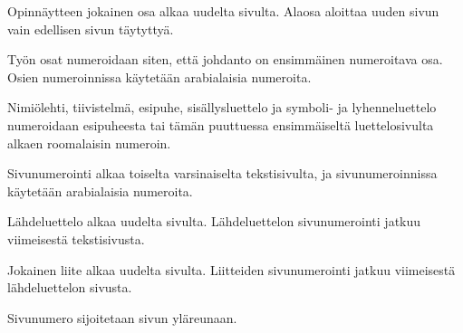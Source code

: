 \documentclass[english,12pt,a4paper,pdftex,elec,utf8]{aaltothesis}
\begin{document}
Opinn\"aytteen jokainen osa alkaa uudelta sivulta. Alaosa aloittaa uuden
sivun vain edellisen sivun t\"aytytty\"a.

Ty\"on osat numeroidaan siten, ett\"a johdanto on ensimm\"ainen numeroitava
osa. Osien numeroinnissa k\"aytet\"a\"an arabialaisia numeroita.

Nimi\"olehti, tiivistelm\"a, esipuhe, sis\"allysluettelo ja symboli- ja
lyhenneluettelo numeroidaan esipuheesta tai t\"am\"an puuttuessa
ensimm\"aiselt\"a luettelosivulta alkaen roomalaisin numeroin.

Sivunumerointi alkaa toiselta varsinaiselta tekstisivulta, ja
sivunumeroinnissa k\"aytet\"a\"an arabialaisia numeroita.

L\"ahdeluettelo alkaa uudelta sivulta. L\"ahdeluettelon sivunumerointi
jatkuu viimeisest\"a tekstisivusta.

Jokainen liite alkaa uudelta sivulta. Liitteiden sivunumerointi
jatkuu viimeisest\"a l\"ahdeluettelon sivusta.

Sivunumero sijoitetaan sivun yl\"areunaan.
\end{document}

